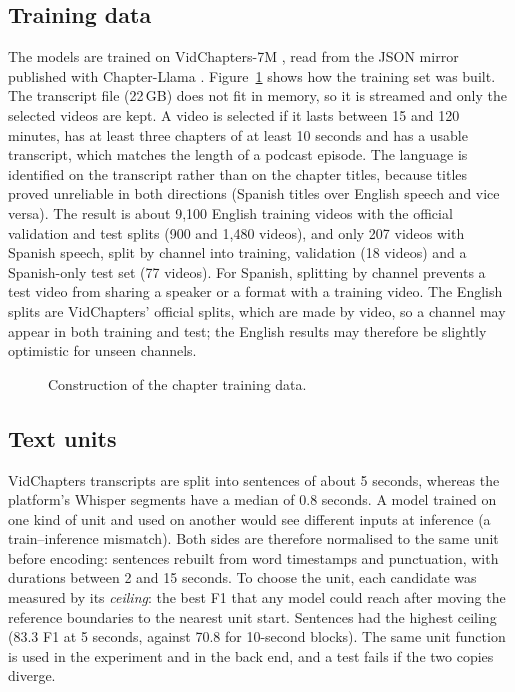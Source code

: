 \subsection*{Training data}

The models are trained on VidChapters-7M \cite{yang2023vidchapters}, read from the JSON mirror published with Chapter-Llama \cite{ventura2025chapterllama}. Figure~\ref{fig:chapters-data} shows how the training set was built. The transcript file (22\,GB) does not fit in memory, so it is streamed and only the selected videos are kept. A video is selected if it lasts between 15 and 120 minutes, has at least three chapters of at least 10 seconds and has a usable transcript, which matches the length of a podcast episode. The language is identified on the transcript rather than on the chapter titles, because titles proved unreliable in both directions (Spanish titles over English speech and vice versa). The result is about 9{,}100 English training videos with the official validation and test splits (900 and 1{,}480 videos), and only 207 videos with Spanish speech, split by channel into training, validation (18 videos) and a Spanish-only test set (77 videos). For Spanish, splitting by channel prevents a test video from sharing a speaker or a format with a training video. The English splits are VidChapters' official splits, which are made by video, so a channel may appear in both training and test; the English results may therefore be slightly optimistic for unseen channels.

\begin{figure}[H]
\centering
{}
\caption{Construction of the chapter training data.}
\label{fig:chapters-data}
\end{figure}

\subsection*{Text units}

VidChapters transcripts are split into sentences of about 5 seconds, whereas the platform's Whisper segments have a median of 0.8 seconds. A model trained on one kind of unit and used on another would see different inputs at inference (a train--inference mismatch). Both sides are therefore normalised to the same unit before encoding: sentences rebuilt from word timestamps and punctuation, with durations between 2 and 15 seconds. To choose the unit, each candidate was measured by its \textit{ceiling}: the best F1 that any model could reach after moving the reference boundaries to the nearest unit start. Sentences had the highest ceiling (83.3 F1 at 5 seconds, against 70.8 for 10-second blocks). The same unit function is used in the experiment and in the back end, and a test fails if the two copies diverge.

